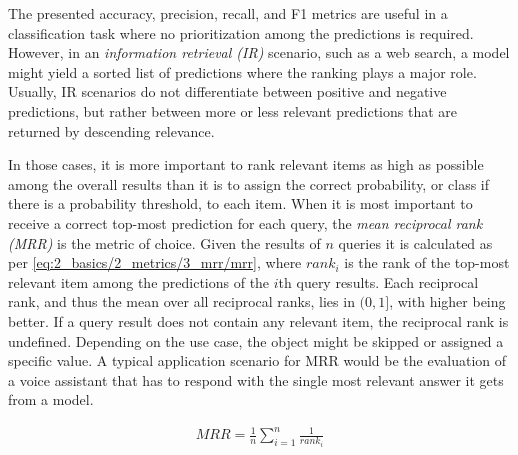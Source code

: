 The presented accuracy, precision, recall, and F1 metrics are useful in a classification task where no prioritization among the predictions is required. However, in an \emph{information retrieval (IR)} scenario, such as a web search, a model might yield a sorted list of predictions where the ranking plays a major role. Usually, IR scenarios do not differentiate between positive and negative predictions, but rather between more or less relevant predictions that are returned by descending relevance.

In those cases, it is more important to rank relevant items as high as possible among the overall results than it is to assign the correct probability, or class if there is a probability threshold, to each item. When it is most important to receive a correct top-most prediction for each query, the \emph{mean reciprocal rank (MRR)} is the metric of choice. Given the results of $n$ queries it is calculated as per \autoref{eq:2_basics/2_metrics/3_mrr/mrr}, where $rank_i$ is the rank of the top-most relevant item among the predictions of the $i$th query results. Each reciprocal rank, and thus the mean over all reciprocal ranks, lies in $(0, 1]$, with higher being better. If a query result does not contain any relevant item, the reciprocal rank is undefined. Depending on the use case, the object might be skipped or assigned a specific value. A typical application scenario for MRR would be the evaluation of a voice assistant that has to respond with the single most relevant answer it gets from a model.

\begin{align}
    MRR = \frac{1}{n} \sum_{i=1}^{n} \frac{1}{rank_i}
    \label{eq:2_basics/2_metrics/3_mrr/mrr}
\end{align}
